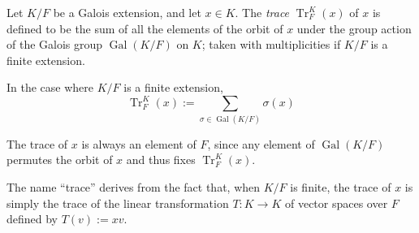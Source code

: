 \documentclass{article}
\begin{document}
Let $K/F$ be a Galois extension, and let $x \in K$. The {\em trace} $\operatorname{Tr}_F^K(x)$ of $x$ is defined to be the sum of all the elements of the orbit of $x$ under the group action of the Galois group $\operatorname{Gal}(K/F)$ on $K$; taken with multiplicities if $K/F$ is a finite extension.

In the case where $K/F$ is a finite extension,
$$
\operatorname{Tr}_F^K(x) := \sum_{\sigma \in \operatorname{Gal}(K/F)} \sigma(x)
$$

The trace of $x$ is always an element of $F$, since any element of $\operatorname{Gal}(K/F)$ permutes the orbit of $x$ and thus fixes $\operatorname{Tr}_F^K(x)$.

The name ``trace'' derives from the fact that, when $K/F$ is finite, the trace of $x$ is simply the trace of the linear transformation $T: K \longrightarrow K$ of vector spaces over $F$ defined by $T(v) := xv$.
\end{document}

